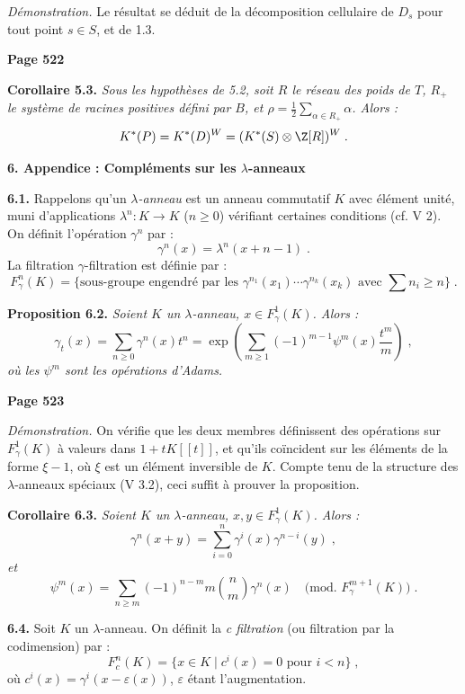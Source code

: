 \textit{D\'emonstration.} Le r\'esultat se d\'eduit de la d\'ecomposition cellulaire de $D_s$ pour tout point $s \in S$, et de 1.3.

\newpage
\noindent\textbf{Page 522}

\smallskip
\noindent\textbf{Corollaire 5.3.} \textit{Sous les hypoth\`eses de 5.2, soit $R$ le r\'eseau des poids de $T$, $R_+$ le syst\`eme de racines positives d\'efini par $B$, et $\rho = \frac{1}{2}\sum_{\alpha \in R_+} \alpha$. Alors :
\[
K^*(P) = K^*(D)^{W} = (K^*(S) \otimes \Z[R])^{W}\;.
\]}

\smallskip
\noindent\textbf{6. Appendice : Compl\'ements sur les $\lambda$-anneaux}

\smallskip
\noindent\textbf{6.1.} Rappelons qu'un \textit{$\lambda$-anneau} est un anneau commutatif $K$ avec \'el\'ement unit\'e, muni d'applications $\lambda^n : K \longrightarrow K$ ($n \geq 0$) v\'erifiant certaines conditions (cf. V 2). On d\'efinit l'op\'eration $\gamma^n$ par :
\[
\gamma^n(x) = \lambda^n(x + n - 1)\;.
\]
La filtration $\gamma$-filtration est d\'efinie par :
\[
F_\gamma^n(K) = \{\text{sous-groupe engendr\'e par les } \gamma^{n_1}(x_1) \cdots \gamma^{n_k}(x_k) \text{ avec } \sum n_i \geq n\}\;.
\]

\smallskip
\noindent\textbf{Proposition 6.2.} \textit{Soient $K$ un $\lambda$-anneau, $x \in F_\gamma^1(K)$. Alors :
\[
\gamma_t(x) = \sum_{n \geq 0} \gamma^n(x) t^n = \exp\left(\sum_{m \geq 1} (-1)^{m-1} \psi^m(x) \frac{t^m}{m}\right)\;,
\]
o\`u les $\psi^m$ sont les op\'erations d'Adams.}

\newpage
\noindent\textbf{Page 523}

\textit{D\'emonstration.} On v\'erifie que les deux membres d\'efinissent des op\'erations sur $F_\gamma^1(K)$ \`a valeurs dans $1 + tK[[t]]$, et qu'ils co\"incident sur les \'el\'ements de la forme $\xi - 1$, o\`u $\xi$ est un \'el\'ement inversible de $K$. Compte tenu de la structure des $\lambda$-anneaux sp\'eciaux (V 3.2), ceci suffit \`a prouver la proposition.

\smallskip
\noindent\textbf{Corollaire 6.3.} \textit{Soient $K$ un $\lambda$-anneau, $x, y \in F_\gamma^1(K)$. Alors :
\[
\gamma^n(x+y) = \sum_{i=0}^n \gamma^i(x) \gamma^{n-i}(y)\;,
\]
et
\[
\psi^m(x) = \sum_{n \geq m} (-1)^{n-m} m \binom{n}{m} \gamma^n(x)\quad \text{(mod. } F_\gamma^{m+1}(K)\text{)}\;.
\]}

\smallskip
\noindent\textbf{6.4.} Soit $K$ un $\lambda$-anneau. On d\'efinit la \textit{c filtration} (ou filtration par la codimension) par :
\[
F_c^n(K) = \{x \in K \mid c^i(x) = 0 \text{ pour } i < n\}\;,
\]
o\`u $c^i(x) = \gamma^i(x - \varepsilon(x))$, $\varepsilon$ \'etant l'augmentation.

